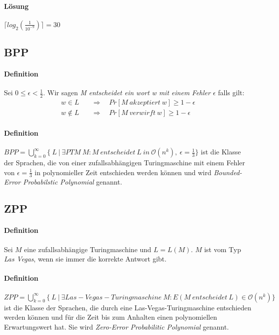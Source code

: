 \paragraph{Lösung}
$\lceil log_{2}(\frac{1}{10^{-9}}) \rceil = 30$

\subsection{BPP}
\paragraph{Definition}
Sei $0 \leq \epsilon < \frac{1}{2}$. Wir sagen \emph{M entscheidet ein wort w mit einem Fehler $\epsilon$} falls gilt:
\begin{align*}
	w \in L \quad & \Rightarrow \quad Pr[M\ akzeptiert\ w] \geq 1 - \epsilon \\
	w \notin L \quad & \Rightarrow \quad Pr[M\ verwirft\ w] \geq 1 - \epsilon
\end{align*}

\paragraph{Definition}
$BPP = \bigcup\limits_{k=0}^{\infty} \bigl\{\ L\ \bigl\lvert\ \exists PTM\ M : M\ entscheidet\ L\ in\ \mathcal{O}(n^k),\ \epsilon =  \frac{1}{3} \bigl\}$ ist die Klasse der Sprachen, die von einer zufallsabhängigen Turingmaschine mit einem Fehler von $\epsilon = \frac{1}{3}$ in polynomieller Zeit entschieden werden können und wird \emph{Bounded-Error Probabilstic Polynomial} genannt.


\subsection{ZPP}
\paragraph{Definition}
Sei $M$ eine zufallsabhängige Turingmaschine und $L = L(M)$. $M$ ist vom Typ \emph{Las Vegas}, wenn sie immer die korrekte Antwort gibt.

\paragraph{Definition}
$ZPP = \bigcup\limits_{k=0}^{\infty} \bigl\{\ L\ \bigl\lvert\ \exists Las-Vegas-Turingmaschine\ M : E(M\ entscheidet\ L) \in \mathcal{O}(n^k) \bigl\}$ ist die Klasse der Sprachen, die durch eine Las-Vegas-Turingmaschine entschieden werden können und für die Zeit bis zum Anhalten einen polynomiellen Erwartungswert hat. 
Sie wird \emph{Zero-Error Probabilitic Polynomial} genannt.


